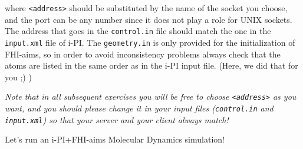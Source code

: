 \documentclass[a4paper,11pt]{scrartcl}
\begin{document}
\noindent where \texttt{<address>} should be substituted by the name of the socket you choose, and the port can be any number since it does not play a role for UNIX sockets.
The address that goes in the \texttt{control.in} file should match the one in the \texttt{input.xml} file of i-PI.
The \texttt{geometry.in} is only provided for the initialization of FHI-aims, so in order to avoid inconsistency problems always check that the atoms are listed in the same order as in the i-PI input file.
(Here, we did that for you ;) )

\textit{Note that in all subsequent exercises you will be free to choose \texttt{<address>} as you want, and you should please change it in your input files (\texttt{control.in} and \texttt{input.xml}) so that your server and your client always match!}


Let's run an i-PI+FHI-aims Molecular Dynamics simulation!
\end{document}
